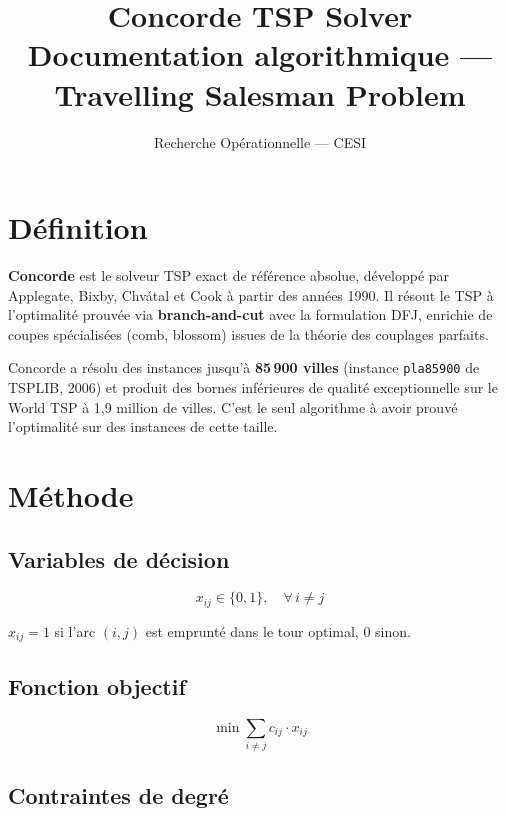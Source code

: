 \documentclass[12pt, a4paper]{article}
\title{
  \textbf{Concorde TSP Solver}\\
  \large Documentation algorithmique --- Travelling Salesman Problem
}
\author{Recherche Opérationnelle --- CESI}
\date{}
\begin{document}
\maketitle
\tableofcontents
\newpage

\section{Définition}

\textbf{Concorde} est le solveur TSP exact de référence absolue, développé par
Applegate, Bixby, Chvátal et Cook à partir des années 1990. Il résout le TSP
à l'optimalité prouvée via \textbf{branch-and-cut} avec la formulation DFJ,
enrichie de coupes spécialisées (comb, blossom) issues de la théorie des
couplages parfaits.

Concorde a résolu des instances jusqu'à \textbf{85\,900 villes} (instance
\texttt{pla85900} de TSPLIB, 2006) et produit des bornes inférieures de
qualité exceptionnelle sur le World TSP à 1,9 million de villes. C'est le
seul algorithme à avoir prouvé l'optimalité sur des instances de cette taille.

\section{Méthode}

\subsection{Variables de décision}

\begin{equation}
  x_{ij} \in \{0, 1\}, \quad \forall\, i \neq j
\end{equation}

$x_{ij} = 1$ si l'arc $(i,j)$ est emprunté dans le tour optimal, $0$ sinon.

\subsection{Fonction objectif}

\begin{equation}
  \min \sum_{i \neq j} c_{ij} \cdot x_{ij}
\end{equation}

\subsection{Contraintes de degré}
\end{document}
